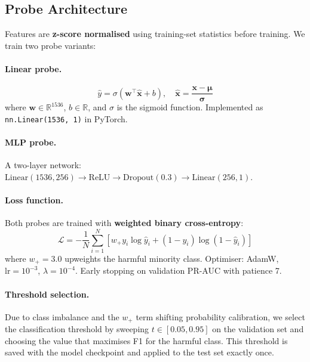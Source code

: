 \documentclass[11pt,a4paper]{article}
\begin{document}
\subsection{Probe Architecture}
\label{sec:probe}

Features are \textbf{z-score normalised} using training-set statistics before training.
We train two probe variants:

\paragraph{Linear probe.}
\begin{equation}
  \hat{y} = \sigma\!\left(\mathbf{w}^\top \hat{\mathbf{x}} + b\right), \quad
  \hat{\mathbf{x}} = \frac{\mathbf{x} - \boldsymbol{\mu}}{\boldsymbol{\sigma}}
\end{equation}
where $\mathbf{w} \in \mathbb{R}^{1536}$, $b \in \mathbb{R}$, and $\sigma$ is the
sigmoid function. Implemented as \texttt{nn.Linear(1536, 1)} in PyTorch.

\paragraph{MLP probe.}
A two-layer network: $\text{Linear}(1536, 256) \to \text{ReLU} \to \text{Dropout}(0.3) \to \text{Linear}(256, 1)$.

\paragraph{Loss function.}
Both probes are trained with \textbf{weighted binary cross-entropy}:
\begin{equation}
  \mathcal{L} = -\frac{1}{N}\sum_{i=1}^{N}
    \left[ w_+ y_i \log \hat{y}_i + (1-y_i)\log(1-\hat{y}_i) \right]
\end{equation}
where $w_+ = 3.0$ upweights the harmful minority class. Optimiser: AdamW,
$\text{lr}=10^{-3}$, $\lambda=10^{-4}$. Early stopping on validation PR-AUC
with patience 7.

\paragraph{Threshold selection.}
Due to class imbalance and the $w_+$ term shifting probability calibration, we
select the classification threshold by sweeping $t \in [0.05, 0.95]$ on the
validation set and choosing the value that maximises F1 for the harmful class.
This threshold is saved with the model checkpoint and applied to the test set
exactly once.
\end{document}

